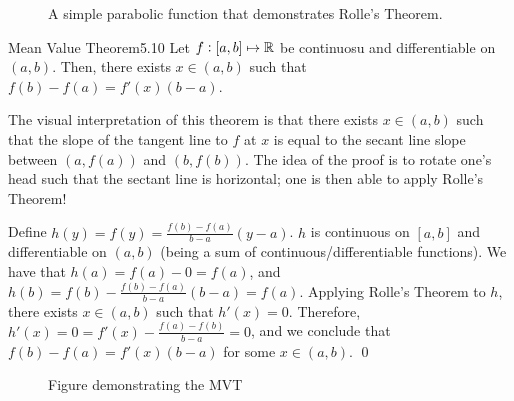 \begin{figure}[htbp]
    \centering
    
    \caption{A simple parabolic function that demonstrates Rolle's Theorem.}
    \label{fig21}
\end{figure}

\setcounter{rudin}{9}
\begin{theorem}{Mean Value Theorem}{5.10}
    Let $f: [a, b] \mapsto \mathbb{R}$ be continuosu and differentiable on $(a, b)$. Then, there exists $x \in (a, b)$ such that $f(b) - f(a) = f'(x)(b - a)$.
\end{theorem}
\noindent The visual interpretation of this theorem is that there exists $x \in (a, b)$ such that the slope of the tangent line to $f$ at $x$ is equal to the secant line slope between $(a, f(a))$ and $(b, f(b))$. The idea of the proof is to rotate one's head such that the sectant line is horizontal; one is then able to apply Rolle's Theorem!

\begin{nproof}
    Define $h(y) = f(y) = \frac{f(b) - f(a)}{b - a}(y - a)$. $h$ is continuous on $[a, b]$ and differentiable on $(a, b)$ (being a sum of continuous/differentiable functions). We have that $h(a) = f(a) - 0 = f(a)$, and $h(b) = f(b) - \frac{f(b) - f(a)}{b - a}(b - a) = f(a)$. Applying Rolle's Theorem to $h$, there exists $x \in (a, b)$ such that $h'(x) = 0$. Therefore, $h'(x) = 0 = f'(x) - \frac{f(a) - f(b)}{b - a} = 0$, and we conclude that $f(b) - f(a) = f'(x)(b - a)$ for some $x \in (a, b)$. \qed
\end{nproof}

\begin{figure}[htbp]
    \centering
    
    \caption{Figure demonstrating the MVT}
    \label{fig22}
\end{figure}


